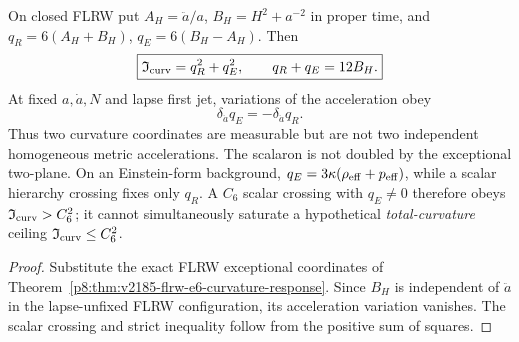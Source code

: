 \documentclass[12pt,a4paper]{article}
\begin{document}
\begin{theorem}
\label{p8:thm:v2166-flrw-constraint-rank}
On closed FLRW put
\(A_H=\ddot a/a\), \(B_H=H^2+a^{-2}\) in proper time, and
\(q_R=6(A_H+B_H)\), \(q_E=6(B_H-A_H)\).  Then
\[
 \boxed{\mathfrak I_{\rm curv}=q_R^2+q_E^2,\qquad
 q_R+q_E=12B_H.}
\]
At fixed \(a,\dot a,N\) and lapse first jet, variations of the acceleration
obey
\[
 \boxed{\delta_{\ddot a}q_E=-\delta_{\ddot a}q_R.}
\]
Thus two curvature coordinates are measurable but are not two independent
homogeneous metric accelerations.  The scalaron is not doubled by the
exceptional two-plane.  On an Einstein-form background,
\(q_E=3\kappa(\rho_{\rm eff}+p_{\rm eff})\), while a scalar hierarchy
crossing fixes only \(q_R\).  A \(C_6\) scalar crossing with
\(q_E\ne0\) therefore obeys
\(\mathfrak I_{\rm curv}>C_6^2\); it cannot simultaneously saturate a
hypothetical \emph{total-curvature} ceiling \(\mathfrak I_{\rm curv}\le C_6^2\).
\end{theorem}
\begin{proof}
Substitute the exact FLRW exceptional coordinates of
Theorem~\ref{p8:thm:v2185-flrw-e6-curvature-response}.  Since
\(B_H\) is independent of \(\ddot a\) in the lapse-unfixed FLRW
configuration, its acceleration variation vanishes.  The scalar crossing
and strict inequality follow from the positive sum of squares.
\end{proof}
\end{document}
